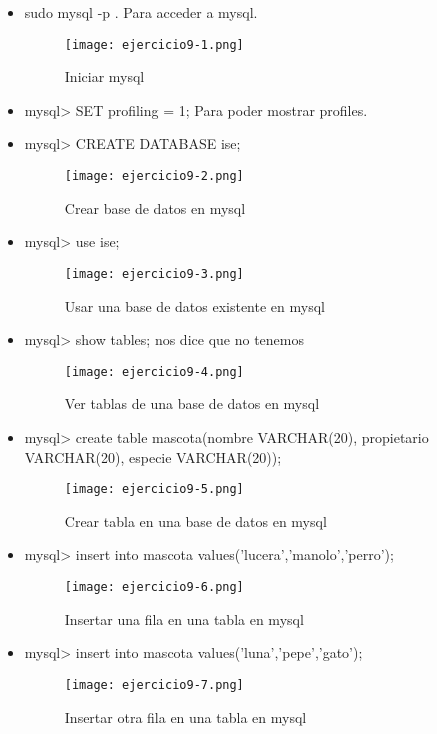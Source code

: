 	\begin{itemize}
		\item sudo mysql -p . Para acceder a mysql.
			\begin{figure}[H] 
				\centering
				\texttt{[image: ejercicio9-1.png]} 
				\label{figura2} 			
				\caption{Iniciar mysql}
			\end{figure}
		\item mysql> SET profiling = 1; Para poder mostrar profiles.
		\item mysql> CREATE DATABASE ise;
			\begin{figure}[H] 
				\centering
				\texttt{[image: ejercicio9-2.png]} 
				\label{figura2} 			
				\caption{Crear base de datos en mysql}
			\end{figure}
		\item mysql> use ise;
			\begin{figure}[H] 
				\centering
				\texttt{[image: ejercicio9-3.png]} 
				\label{figura2} 			
				\caption{Usar una base de datos existente en mysql}
			\end{figure}
		\item mysql> show tables; nos dice que no tenemos
			\begin{figure}[H] 
				\centering
				\texttt{[image: ejercicio9-4.png]} 
				\label{figura2} 			
				\caption{Ver tablas de una base de datos en mysql}
			\end{figure}
		\item mysql> create table mascota(nombre VARCHAR(20), propietario VARCHAR(20), especie VARCHAR(20));
			\begin{figure}[H] 
				\centering
				\texttt{[image: ejercicio9-5.png]} 
				\label{figura2} 			
				\caption{Crear tabla en una base de datos en mysql}
			\end{figure}
		\item mysql> insert into mascota  values('lucera','manolo','perro');
			\begin{figure}[H] 
				\centering
				\texttt{[image: ejercicio9-6.png]} 
				\label{figura2} 			
				\caption{Insertar una fila en una tabla en mysql}
			\end{figure}
		\item mysql> insert into mascota values('luna','pepe','gato');
			\begin{figure}[H] 
				\centering
				\texttt{[image: ejercicio9-7.png]} 
				\label{figura2} 			
				\caption{Insertar otra fila en una tabla en mysql}
			\end{figure}

\end{itemize}
